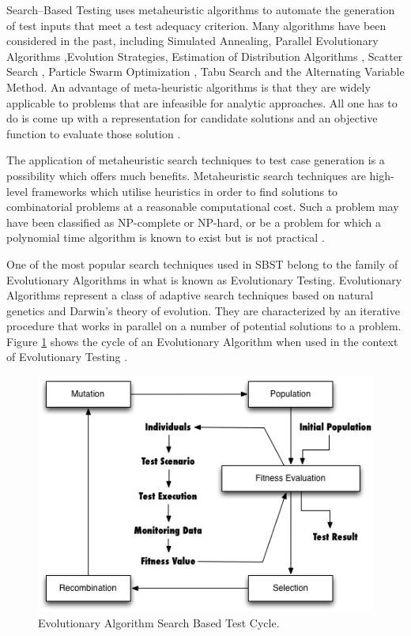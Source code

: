 Search–Based Testing uses metaheuristic algorithms to
automate the generation of test inputs that meet a test
adequacy criterion. Many algorithms have been considered in the past, including Simulated Annealing, Parallel Evolutionary Algorithms \cite{Alba2008},Evolution Strategies, Estimation of Distribution Algorithms , Scatter Search , Particle Swarm Optimization , Tabu Search and the Alternating Variable Method. An advantage of meta-heuristic algorithms is that they
are widely applicable to problems that are infeasible for analytic approaches. All one has to do is come up with a representation for candidate solutions and an objective function to evaluate those solution \cite{Baars2011}. 

The application of metaheuristic search techniques to test case generation is a possibility which offers much benefits. Metaheuristic search techniques are high-level frameworks which utilise heuristics in order to find solutions to combinatorial problems at a reasonable computational cost. Such a problem may have been classified as NP-complete or NP-hard, or be a problem for which a polynomial time algorithm is known to exist but is not practical \cite{McMinn2004}.

One of the most popular search techniques used in SBST belong to the family of Evolutionary Algorithms in what is known as Evolutionary Testing. Evolutionary Algorithms represent a class of adaptive search techniques based on natural genetics and Darwin’s theory of evolution. They are characterized by an iterative procedure that works in parallel on a number of potential solutions to a problem. Figure \ref{fig:evocycle}  shows the cycle
of an Evolutionary Algorithm when used in the context of
Evolutionary Testing \cite{Baars2011}.

\begin{figure}[h]
\centering
\includegraphics[width=1\textwidth]{./images/evolutionary.png}
\caption{Evolutionary Algorithm Search Based Test Cycle\cite{Baars2011}. }
\label{fig:evocycle}
\end{figure}

